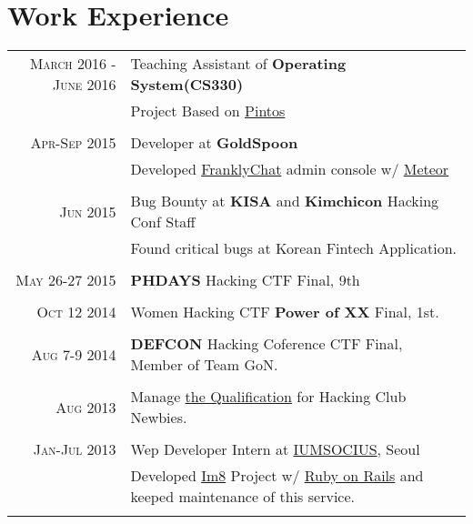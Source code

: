 \documentclass[a4paper,10pt]{article}
\begin{document}
\section{Work Experience}
\begin{tabular}{r|p{11cm}}
    \textsc{March 2016 - June 2016} & Teaching Assistant of \textbf{Operating System(CS330)}  \\ & \footnotesize{Project Based on \href{https://web.stanford.edu/class/cs140/projects/pintos/pintos.html}{Pintos}}\\\multicolumn{2}{c}{} \\
    \textsc{Apr-Sep 2015} & Developer at \textbf{GoldSpoon}  \\ & \footnotesize{Developed \href{http://www.franklychat.com/}{FranklyChat} admin console w/ \href{https://www.meteor.com/}{Meteor}}\\\multicolumn{2}{c}{} \\
    \textsc{Jun 2015} & Bug Bounty at \textbf{KISA} and \textbf{Kimchicon} Hacking Conf Staff \\&\footnotesize{Found critical bugs at Korean Fintech Application.}\\\multicolumn{2}{c}{} \\
    \textsc{May 26-27 2015} & \textbf{PHDAYS} Hacking CTF Final, 9th \\\multicolumn{2}{c}{} \\
    \textsc{Oct 12 2014} & Women Hacking CTF \textbf{Power of XX} Final, 1st.\\\multicolumn{2}{c}{} \\
    \textsc{Aug 7-9 2014} & \textbf{DEFCON} Hacking Coference CTF Final, Member of Team GoN.\\\multicolumn{2}{c}{} \\
    \textsc{Aug 2013} & Manage \href{http://ubunt32.kaist.ac.kr:3000}{the Qualification} for Hacking Club Newbies.\\\multicolumn{2}{c}{} \\
    \textsc{Jan-Jul 2013} & Wep Developer Intern at \textsc{\href{http://www.iumsocius.com/}{IUMSOCIUS}}, Seoul \\&\footnotesize{Developed \href{http://www.im8.net/}{Im8} Project w/ \href{http://rubyonrails.org/}{Ruby on Rails} and keeped maintenance of this service.}\\\multicolumn{2}{c}{} \\
\end{tabular}

\end{document}

